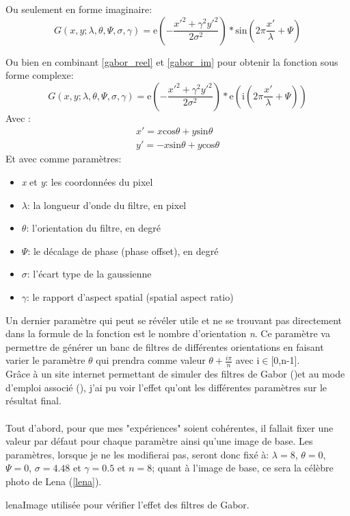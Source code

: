 \documentclass[overfullbox, poster]{polytech/polytech}
\begin{document}
Ou seulement en forme imaginaire:
\begin{equation}
G(x,y;\lambda ,\theta ,\Psi ,\sigma ,\gamma )=\mathrm{e}(- \frac{x'^2+\gamma ^2 y'^2}{2\sigma ^2})*\mathrm{sin}(2\pi \frac{x'}{\lambda}+\Psi)
\label{gabor_im}
\end{equation}

Ou bien en combinant \eqref{gabor_reel} et \eqref{gabor_im} pour obtenir la fonction sous forme complexe:
\begin{equation}
G(x,y;\lambda ,\theta ,\Psi ,\sigma ,\gamma )=\mathrm{e}(- \frac{x'^2+\gamma ^2 y'^2}{2\sigma ^2})*\mathrm{e}(\mathrm{i}(2\pi \frac{x'}{\lambda}+\Psi))
\label{gabor_complexe}
\end{equation}
Avec :
\begin{align*}
x'=x\mathrm{cos}\theta + y\mathrm{sin}\theta \\
y'= -x\mathrm{sin}\theta + y\mathrm{cos}\theta
\end{align*}
Et avec comme paramètres:
\begin{itemize}
\item \textit{x} et \textit{y}: les coordonnées du pixel
\item $\lambda $: la longueur d'onde du filtre, en pixel
\item $\theta $: l'orientation du filtre, en degré
\item $\Psi $: le décalage de phase (phase offset), en degré
\item $\sigma $: l'écart type de la gaussienne
\item $\gamma $: le rapport d'aspect spatial (spatial aspect ratio)\\
\end{itemize}

Un dernier paramètre qui peut se révéler utile et ne se trouvant pas directement dans la formule de la fonction est le nombre d'orientation \textit{n}. Ce paramètre va permettre de générer un banc de filtres de différentes orientations en faisant varier le paramètre $\theta $ qui prendra comme valeur $\theta + \frac{i\pi}{n}$ avec i$\in $[0,n-1].\\
Grâce à un site internet permettant de simuler des filtres de Gabor (\cite{simu_gabor})et au mode d'emploi associé (\cite{instr_simu_gabor}), j'ai pu voir l'effet qu'ont les différentes paramètres sur le résultat final.\\
\\
Tout d'abord, pour que mes "expériences" soient cohérentes, il fallait fixer une valeur par défaut pour chaque paramètre ainsi qu'une image de base. Les paramètres, lorsque je ne les modifierai pas, seront donc fixé à: $\lambda = 8 $, $\theta = 0 $, $\Psi = 0 $, $\sigma = 4.48 $ et $\gamma = 0.5 $ et $n = 8 $; quant à l'image de base, ce sera la célèbre photo de Lena (\autoref{lena}).
\begin{Figure}{lena}{Image utilisée pour vérifier l'effet des filtres de Gabor}.
\end{Figure}
\end{document}
